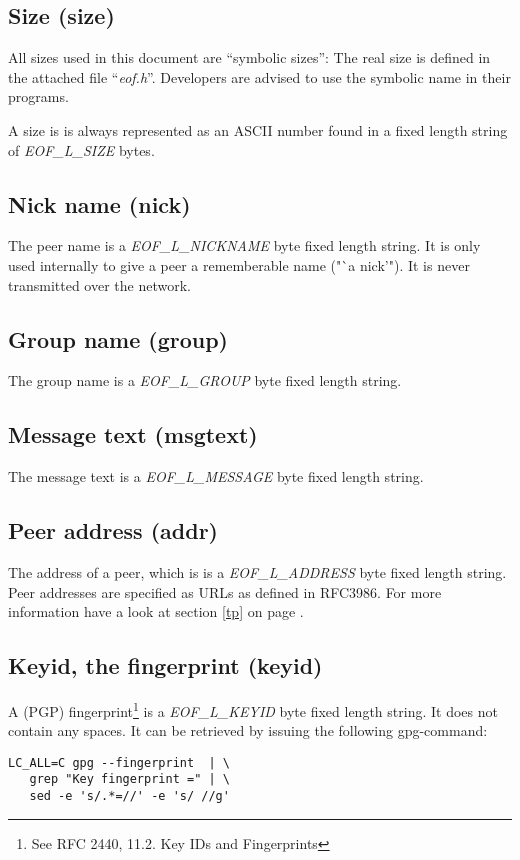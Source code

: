 \subsection{Size (size)}
%
All sizes used in this document are "`symbolic sizes"': The real size
is defined in the attached file "`\emph{eof.h}"'.
Developers are advised to use the symbolic name in their programs.

A size is is always represented as an ASCII number found in a
fixed length string of \emph{EOF\_L\_SIZE} bytes.
\subsection{Nick name (nick)}
The peer name is a \emph{EOF\_L\_NICKNAME} byte fixed length string.
It is only used internally to give a peer a rememberable name ("`a nick'").
It is never transmitted over the network.
\subsection{Group name (group)}
The group name is a \emph{EOF\_L\_GROUP} byte fixed length string.
\subsection{Message text (msgtext)}
The message text is a \emph{EOF\_L\_MESSAGE} byte fixed length string.
\subsection{Peer address (addr)}
The address of a peer, which is is a \emph{EOF\_L\_ADDRESS}
byte fixed length string. Peer addresses are specified as
URLs as defined in RFC3986\cite{uri-1}. For more information have
a look at section \ref{tp} on page \pageref{tp}.
\subsection{Keyid, the fingerprint (keyid)}
A (PGP) fingerprint\footnote{See RFC 2440, 11.2. Key IDs and Fingerprints}
is a \emph{EOF\_L\_KEYID} byte fixed length string.
It does not contain any spaces.
It can be retrieved by issuing the following gpg-command:
\begin{verbatim}
LC_ALL=C gpg --fingerprint  | \
   grep "Key fingerprint =" | \
   sed -e 's/.*=//' -e 's/ //g' 
\end{verbatim}
